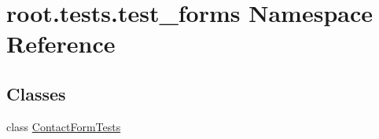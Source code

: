 \hypertarget{namespaceroot_1_1tests_1_1test__forms}{\section{root.\-tests.\-test\-\_\-forms Namespace Reference}
\label{namespaceroot_1_1tests_1_1test__forms}
}
\subsection*{Classes}
\begin{DoxyCompactItemize}
\item 
class \hyperlink{classroot_1_1tests_1_1test__forms_1_1_contact_form_tests}{Contact\-Form\-Tests}
\end{DoxyCompactItemize}
